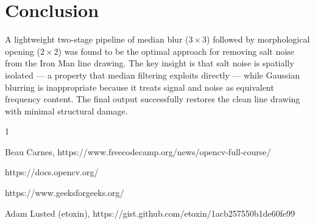 \documentclass[journal]{IEEEtran}
\begin{document}
\section{Conclusion}
A lightweight two-stage pipeline of median blur ($3\times3$) followed by 
morphological opening ($2\times2$) was found to be the optimal approach for 
removing salt noise from the Iron Man line drawing. The key insight is that 
salt noise is spatially isolated — a property that median filtering exploits 
directly — while Gaussian blurring is inappropriate because it treats signal 
and noise as equivalent frequency content. The final output successfully 
restores the clean line drawing with minimal structural damage.

\begin{thebibliography}{1}

Beau Carnes, https://www.freecodecamp.org/news/opencv-full-course/

https://docs.opencv.org/

https://www.geeksforgeeks.org/

Adam Lusted (etoxin), https://gist.github.com/etoxin/1acb257550b1de60fe99
\end{thebibliography}
\end{document}
